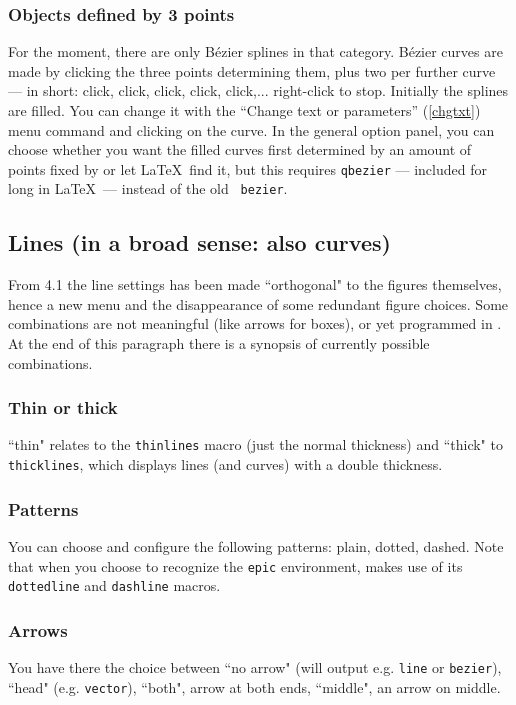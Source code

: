 \documentclass[11pt,a4paper]{article}
\begin{document}
\subsubsection{Objects defined by 3 points}
%
For the moment, there are only B\'ezier splines in that category.
B\'ezier curves are made by clicking the three points determining them,
plus two per further curve
--- in short: click, click, click, click, click,... right-click to
stop.
Initially the splines are filled. You can change it with the
``Change text or parameters'' (\ref{chgtxt}) menu command and clicking on the
curve. In the general option panel, you can choose whether you want
the filled curves first determined by an amount of points fixed by {\TC} or let \LaTeX\, find it, but this requires {\tt \bs qbezier} ---
included for long in \LaTeX\, --- instead of the old {\tt \bs
bezier}.
%
\subsection{Lines (in a broad sense: also curves)}
From {\TC} 4.1 the line settings has been made ``orthogonal" to the figures
themselves, hence a new menu and the disappearance of some redundant
figure choices. Some combinations are not meaningful
(like arrows for boxes), or yet programmed in {\TC}.
At the end of this paragraph there is a synopsis of currently possible combinations.
%
\subsubsection{Thin or thick}
``thin" relates to the {\tt \bs thinlines} macro (just the normal thickness)
and ``thick" to {\tt \bs thicklines}, which displays lines (and curves)
with a double thickness.
%
\subsubsection{Patterns}
You can choose and configure the following patterns:
plain, dotted, dashed. Note that when you choose to recognize
the {\tt epic} environment, {\TC} makes use of its
{\tt \bs dottedline} and {\tt \bs dashline} macros.
%
\subsubsection{Arrows}
%
You have there the choice between ``no arrow" (will output e.g. {\tt \bs line}
or {\tt \bs bezier}), ``head" (e.g. {\tt \bs vector}), ``both", arrow at both ends,
``middle", an arrow on middle.
%
\end{document}
